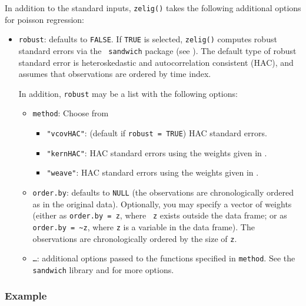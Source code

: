 \documentclass{article}
\begin{document}
In addition to the standard inputs, {\tt zelig()} takes the following
additional options for poisson regression:  
\begin{itemize}
\item {\tt robust}: defaults to {\tt FALSE}.  If {\tt TRUE} is
selected, {\tt zelig()} computes robust standard errors via the {\tt
sandwich} package (see \cite{Zeileis04}).  The default type of robust
standard error is heteroskedastic and autocorrelation consistent (HAC),
and assumes that observations are ordered by time index.

In addition, {\tt robust} may be a list with the following options:  
\begin{itemize}
\item {\tt method}:  Choose from 
\begin{itemize}
\item {\tt "vcovHAC"}: (default if {\tt robust = TRUE}) HAC standard
errors. 
\item {\tt "kernHAC"}: HAC standard errors using the
weights given in \cite{Andrews91}. 
\item {\tt "weave"}: HAC standard errors using the
weights given in \cite{LumHea99}.  
\end{itemize}  
\item {\tt order.by}: defaults to {\tt NULL} (the observations are
chronologically ordered as in the original data).  Optionally, you may
specify a vector of weights (either as {\tt order.by = z}, where {\tt
z} exists outside the data frame; or as {\tt order.by = \~{}z}, where
{\tt z} is a variable in the data frame).  The observations are
chronologically ordered by the size of {\tt z}.
\item {\tt \dots}:  additional options passed to the functions 
specified in {\tt method}.   See the {\tt sandwich} library and
\cite{Zeileis04} for more options.   
\end{itemize}
\end{itemize}

\subsubsection{Example}
\end{document}
